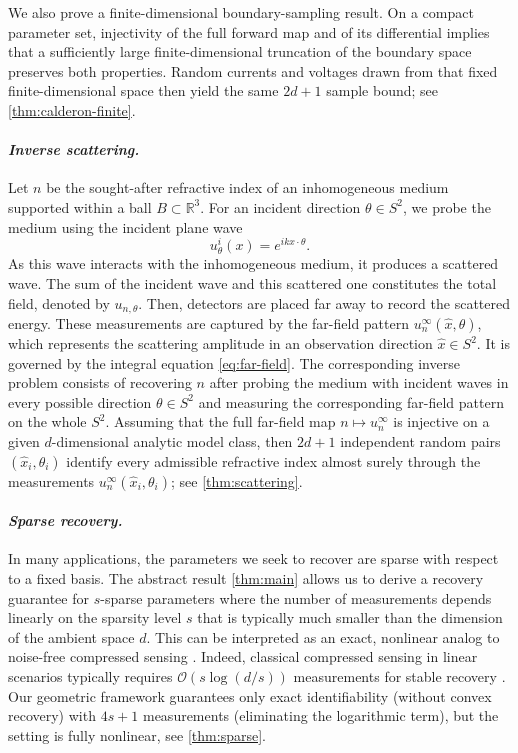 \documentclass[11pt,oneside]{amsart}
\theoremstyle{plain}
\theoremstyle{definition}
\theoremstyle{remark}
\newcommand{\RR}{\mathbb{R}}
\begin{document}
We also prove a finite-dimensional boundary-sampling result. On a compact parameter set, injectivity of the full forward map and of its differential implies that a sufficiently large finite-dimensional truncation of the boundary space preserves both properties. Random currents and voltages drawn from that fixed finite-dimensional space then yield the same $2d+1$ sample bound; see \cref{thm:calderon-finite}.
\vspace{.1cm}
\paragraph{\emph{Inverse scattering.}}
Let $n$ be the sought-after refractive index of an inhomogeneous medium supported within a ball $B\subset\RR^3$. For an incident direction $\theta\in S^2$, we probe the medium using the incident plane wave
\begin{equation}\label{eq:plane-wave}
    u_\theta^i(x)=e^{ikx\cdot\theta}.
\end{equation}
As this wave interacts with the inhomogeneous medium, it produces a scattered wave. The sum of the incident wave and this scattered one constitutes the total field, denoted by $u_{n,\theta}$. Then, detectors are placed far away to record the scattered energy. These measurements are captured by the far-field pattern $u_n^\infty(\widehat{x},\theta)$, which represents the scattering amplitude in an observation direction $\widehat{x}\in S^2$. It is governed by the integral equation \eqref{eq:far-field}. The corresponding inverse problem consists of recovering $n$ after probing the medium with incident waves in every possible direction $\theta\in S^2$ and measuring the corresponding far-field pattern on the whole $S^2$. Assuming that the full far-field map $n\mapsto u^\infty_n$  is injective on a given $d$-dimensional analytic model class, then $2d+1$ independent random pairs $(\widehat x_i,\theta_i)$ identify every admissible refractive index almost surely through the measurements $u_n^\infty(\widehat x_i,\theta_i)$; see \cref{thm:scattering}.
\vspace{.1cm}
\paragraph{\emph{Sparse recovery.}} In many applications, the parameters we seek to recover are sparse with respect to a fixed basis. The abstract result \cref{thm:main} allows us to derive a recovery guarantee for $s$-sparse parameters where the number of measurements depends linearly on the sparsity level $s$ that is typically much smaller than the dimension of the ambient space $d$. This can be interpreted as an exact, nonlinear analog to noise-free compressed sensing \cite{Foucart2013-od}. Indeed, classical compressed sensing in linear scenarios typically requires $\mathcal O(s\log(d/s))$ measurements for stable recovery \cite{candes2006robust,donoho2006compressed}. Our geometric framework guarantees only exact identifiability (without convex recovery) with $4s+1$ measurements (eliminating the logarithmic term), but the setting is fully nonlinear, see \cref{thm:sparse}.
\end{document}
